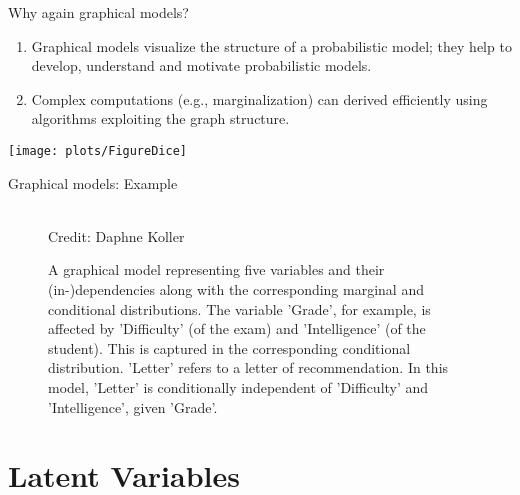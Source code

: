 \begin{frame}{Why again graphical models?}
    
    \begin{minipage}{.62\textwidth}
    \begin{enumerate}\itemsep2ex
    \item Graphical models visualize the structure of a probabilistic
    model; they help to develop, understand and motivate probabilistic models.
    \pause
    \item Complex computations (e.g., marginalization)
    can derived efficiently
    using algorithms exploiting the graph structure.
    \end{enumerate}
    \end{minipage}
    \hfill\begin{minipage}{.33\textwidth}
    \phantom{mini}
    
    \hfill\texttt{[image: plots/FigureDice]}
    \end{minipage}

\end{frame}

\begin{frame}{Graphical models: Example}

  \begin{figure}
    \centering
    \tiny{\\Credit: Daphne Koller}
    \caption{\footnotesize A graphical model representing five variables and their (in-)dependencies along with the corresponding marginal and conditional distributions. The variable 'Grade', for example, is affected by 'Difficulty' (of the exam) and 'Intelligence' (of the student). This is captured in the corresponding conditional distribution. 'Letter' refers to a letter of recommendation. In this model, 'Letter' is conditionally independent of 'Difficulty' and 'Intelligence', given 'Grade'.}
  \end{figure}

\end{frame}


\section{Latent Variables}

